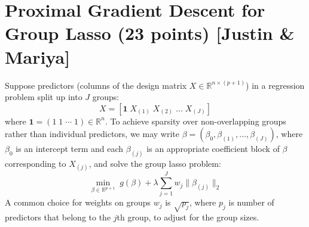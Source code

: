 \documentclass{article}
\theoremstyle{remark}
\theoremstyle{definition}
\def\R{\mathbb{R}}
\begin{document}
\section{Proximal Gradient Descent for Group Lasso (23 points) [Justin \& Mariya]}
Suppose predictors (columns of the design matrix $X\in\R^{n \times (p+1)}$) in a
regression problem split up into $J$ groups:
\begin{equation}
X = \left[ \mathbf{1}\; X_{(1)} \; X_{(2)} \; \dots \;X_{(J)} \right]
\end{equation}
where $\mathbf{1} = (1\; 1 \; \cdots \;1) \in \mathbb{R}^n$. To
achieve sparsity over non-overlapping groups rather than individual 
predictors, we may write $\beta = (\beta_0, \beta_{(1)}, \dots,
\beta_{(J)})$, where $\beta_0$ is an intercept term and each
$\beta_{(j)}$ is an appropriate coefficient block of $\beta$
corresponding to $X_{(j)}$, and solve the group lasso problem:
\begin{equation}
\label{eq:group_lasso}
  \min_{\beta \in \mathbb{R}^{p+1}} \; 
g(\beta) + \lambda \sum_{j=1}^J w_j \|\beta_{(j)}\|_2
\end{equation}
A common choice for weights on
groups $w_j$ is $\sqrt{p_j}$, where $p_j$ is number of predictors that
belong to the $j$th group, to adjust for the group sizes.  
\end{document}

